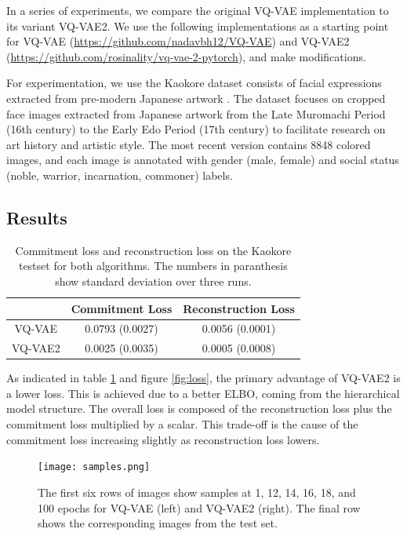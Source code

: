 \documentclass{article}
\begin{document}
In a series of experiments, we compare the original VQ-VAE implementation to its variant VQ-VAE2. We use the following implementations as a starting point for VQ-VAE (\url{https://github.com/nadavbh12/VQ-VAE}) and VQ-VAE2 (\url{https://github.com/rosinality/vq-vae-2-pytorch}), and make modifications.

For experimentation, we use the Kaokore dataset consists of facial expressions extracted from pre-modern Japanese artwork \cite{kaokore}. The dataset focuses on cropped face images extracted from Japanese artwork from the Late Muromachi Period (16th century) to the Early Edo Period (17th century) to facilitate research on art history and artistic style. The most recent version contains 8848 colored images, and each image is annotated with gender (male, female) and social status (noble, warrior, incarnation, commoner) labels. 

\subsection{Results}

\begin{table}[!h]
    \centering
    \begin{tabular}{c c c}
        & Commitment Loss & Reconstruction Loss \\
        \hline
        VQ-VAE & 0.0793 (0.0027) & 0.0056 (0.0001) \\
        VQ-VAE2 & 0.0025 (0.0035) & 0.0005 (0.0008)
    \end{tabular}
    \label{table:loss}
    \caption{Commitment loss and reconstruction loss on the Kaokore testset for both algorithms. The numbers in paranthesis show standard deviation over three runs.}
\end{table}

As indicated in table \ref{table:loss} and figure \ref{fig:loss}, the primary advantage of VQ-VAE2 is a lower loss. This is achieved due to a better ELBO, coming from the hierarchical model structure. The overall loss is composed of the reconstruction loss plus the commitment loss multiplied by a scalar. This trade-off is the cause of the commitment loss increasing slightly as reconstruction loss lowers. 

\begin{figure}[!h]
    \centering
    \texttt{[image: samples.png]}
    \label{fig:samples}
    \caption{The first six rows of images show samples at 1, 12, 14, 16, 18, and 100 epochs for VQ-VAE (left) and VQ-VAE2 (right). The final row shows the corresponding images from the test set.}
\end{figure}
\end{document}
